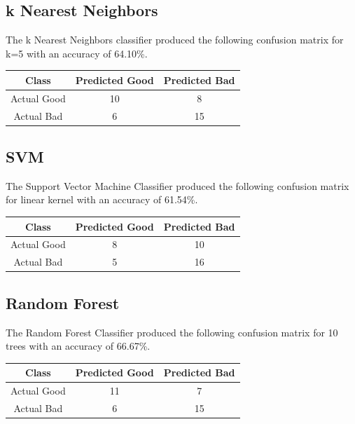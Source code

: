 \documentclass[11pt, a4paper]{article}
\begin{document}
\subsection{k Nearest Neighbors}
The k Nearest Neighbors classifier produced the following confusion matrix for k=5 with an accuracy of 64.10\%.
\begin{center}
 \begin{tabular}{||c c c||} 
 \hline\hline
Class & Predicted Good & Predicted Bad \\ 
 \hline
 Actual Good & 10 & 8\\
 \hline
 Actual Bad & 6 & 15\\
 \hline
\end{tabular}
\end{center}

\subsection{SVM}
The Support Vector Machine Classifier produced the following confusion matrix for linear kernel with an accuracy of 61.54\%.
\begin{center}
 \begin{tabular}{||c c c||} 
 \hline\hline
Class & Predicted Good & Predicted Bad \\ 
 \hline
 Actual Good & 8 & 10\\
 \hline
 Actual Bad & 5 & 16\\
 \hline
\end{tabular}
\end{center}

\subsection{Random Forest}
The Random Forest Classifier produced the following confusion matrix for 10 trees with an accuracy of 66.67\%.
\begin{center}
 \begin{tabular}{||c c c||} 
 \hline\hline
Class & Predicted Good & Predicted Bad \\ 
 \hline
 Actual Good & 11 & 7\\
 \hline
 Actual Bad & 6 & 15\\
 \hline
\end{tabular}
\end{center}
\end{document}
